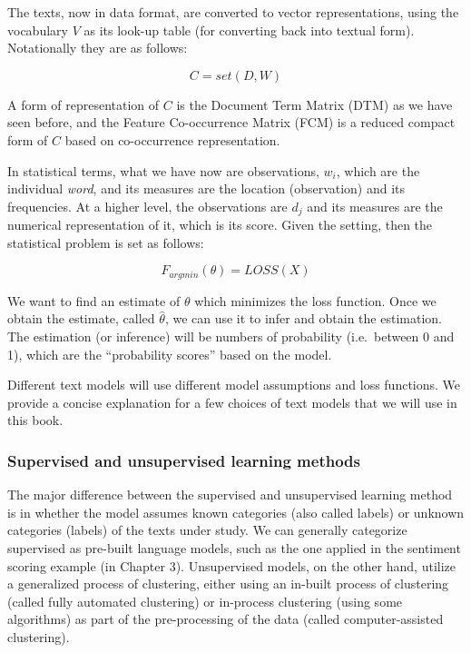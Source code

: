 \documentclass[
]{article}
\begin{document}
The texts, now in data format, are converted to vector representations, using the vocabulary \(V\) as its look-up table (for converting back into textual form). Notationally they are as follows:

\[C = set (D,W)\]

A form of representation of \(C\) is the Document Term Matrix (DTM) as we have seen before, and the Feature Co-occurrence Matrix (FCM) is a reduced compact form of \(C\) based on co-occurrence representation.

In statistical terms, what we have now are observations, \(w_i\), which are the individual \emph{word}, and its measures are the location (observation) and its frequencies. At a higher level, the observations are \(d_j\) and its measures are the numerical representation of it, which is its score. Given the setting, then the statistical problem is set as follows:

\[F_{argmin}(\theta) = LOSS(X)\]

We want to find an estimate of \(\theta\) which minimizes the loss function. Once we obtain the estimate, called \(\hat{\theta}\), we can use it to infer and obtain the estimation. The estimation (or inference) will be numbers of probability (i.e.~between 0 and 1), which are the ``probability scores'' based on the model.

Different text models will use different model assumptions and loss functions. We provide a concise explanation for a few choices of text models that we will use in this book.

\hypertarget{supervised-and-unsupervised-learning-methods}{%
\subsubsection{Supervised and unsupervised learning methods}\label{supervised-and-unsupervised-learning-methods}}

The major difference between the supervised and unsupervised learning method is in whether the model assumes known categories (also called labels) or unknown categories (labels) of the texts under study. We can generally categorize supervised as pre-built language models, such as the one applied in the sentiment scoring example (in Chapter 3). Unsupervised models, on the other hand, utilize a generalized process of clustering, either using an in-built process of clustering (called fully automated clustering) or in-process clustering (using some algorithms) as part of the pre-processing of the data (called computer-assisted clustering).
\end{document}
